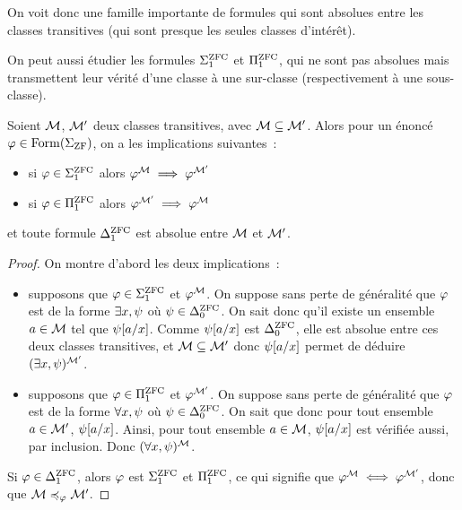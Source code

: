 On voit donc une famille importante de formules qui sont absolues entre les
classes transitives (qui sont presque les seules classes d'intérêt).

On peut aussi étudier les formules $\Sigma_{1}^{\operatorname{ZFC}}$ et $\Pi_{1}^{\operatorname{ZFC}}$, qui ne sont
pas absolues mais transmettent leur vérité d'une classe à une sur-classe
(respectivement à une sous-classe).

\begin{proposition}
  Soient $\mathcal{M}$, $\mathcal{M}'$ deux classes transitives, avec
  $\mathcal{M} \subseteq \mathcal{M}'$. Alors pour un énoncé
  $\varphi\in\operatorname{Form}(\Sigma_{\operatorname{ZF}})$, on a les implications suivantes~:
  \begin{itemize}
  \item si $\varphi \in \Sigma_{1}^{\operatorname{ZFC}}$ alors
    $\varphi^{\mathcal{M}} \implies \varphi^{\mathcal{M}'}$
  \item si $\varphi \in \Pi_{1}^{\operatorname{ZFC}}$ alors
    $\varphi^{\mathcal{M}'} \implies \varphi^{\mathcal{M}}$
  \end{itemize}
  et toute formule $\Delta_{1}^{\operatorname{ZFC}}$ est absolue entre $\mathcal{M}$ et $\mathcal{M}'$.
\end{proposition}

\begin{proof}
  On montre d'abord les deux implications~:
  \begin{itemize}
  \item supposons que $\varphi \in \Sigma_{1}^{\operatorname{ZFC}}$ et $\varphi^{\mathcal{M}}$. On
    suppose sans perte de généralité que $\varphi$ est de la forme
    $\exists x, \psi$ où $\psi\in\Delta_{0}^{\operatorname{ZFC}}$. On sait donc qu'il existe un
    ensemble $a\in\mathcal{M}$ tel que $\psi[a/x]$. Comme $\psi[a/x]$ est
    $\Delta_{0}^{\operatorname{ZFC}}$, elle est absolue entre ces deux classes transitives, et
    $\mathcal{M} \subseteq\mathcal{M}'$ donc $\psi[a/x]$ permet de déduire
    $(\exists x, \psi)^{\mathcal{M}'}$.
  \item supposons que $\varphi \in \Pi_{1}^{\operatorname{ZFC}}$ et $\varphi^{\mathcal{M}'}$. On
    suppose sans perte de généralité que $\varphi$ est de la forme
    $\forall x, \psi$ où $\psi\in\Delta_{0}^{\operatorname{ZFC}}$. On sait que donc pour tout
    ensemble $a\in \mathcal{M}'$, $\psi[a/x]$. Ainsi, pour tout ensemble
    $a\in \mathcal{M}$, $\psi[a/x]$ est vérifiée aussi, par inclusion. Donc
    $(\forall x, \psi)^{\mathcal{M}}$.
  \end{itemize}

  Si $\varphi\in\Delta_{1}^{\operatorname{ZFC}}$, alors $\varphi$ est $\Sigma_{1}^{\operatorname{ZFC}}$ et
  $\Pi_{1}^{\operatorname{ZFC}}$, ce qui signifie que $\varphi^{\mathcal{M}}\iff \varphi^{\mathcal{M}'}$, donc
  que $\mathcal{M}\preccurlyeq_{\varphi} \mathcal{M}'$.
\end{proof}

